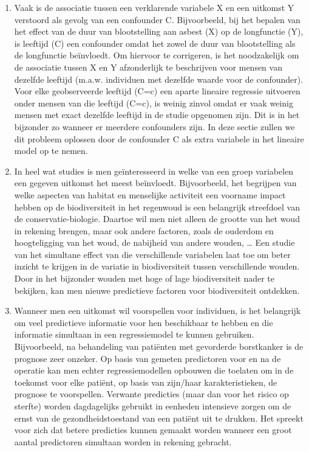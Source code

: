 \documentclass[
  dutch,
  letterpaper,
  12pt]{book}
\theoremstyle{definition}
\theoremstyle{definition}
\theoremstyle{definition}
\theoremstyle{remark}
\begin{document}
\begin{enumerate}
\def\labelenumi{\arabic{enumi}.}
\item
  Vaak is de associatie tussen een verklarende variabele X en een
  uitkomst Y verstoord als gevolg van een confounder C. Bijvoorbeeld,
  bij het bepalen van het effect van de duur van blootstelling aan
  asbest (X) op de longfunctie (Y), is leeftijd (C) een confounder omdat
  het zowel de duur van blootstelling als de longfunctie beïnvloedt. Om
  hiervoor te corrigeren, is het noodzakelijk om de associatie tussen X
  en Y afzonderlijk te beschrijven voor mensen van dezelfde leeftijd
  (m.a.w. individuen met dezelfde waarde voor de confounder). Voor elke
  geobserveerde leeftijd (C=c) een aparte lineaire regressie uitvoeren
  onder mensen van die leeftijd (C=c), is weinig zinvol omdat er vaak
  weinig mensen met exact dezelfde leeftijd in de studie opgenomen zijn.
  Dit is in het bijzonder zo wanneer er meerdere confounders zijn. In
  deze sectie zullen we dit probleem oplossen door de confounder C als
  extra variabele in het lineaire model op te nemen.
\item
  In heel wat studies is men geïnteresseerd in welke van een groep
  variabelen een gegeven uitkomst het meest beïnvloedt. Bijvoorbeeld,
  het begrijpen van welke aspecten van habitat en menselijke activiteit
  een voorname impact hebben op de biodiversiteit in het regenwoud is
  een belangrijk streefdoel van de conservatie-biologie. Daartoe wil men
  niet alleen de grootte van het woud in rekening brengen, maar ook
  andere factoren, zoals de ouderdom en hoogteligging van het woud, de
  nabijheid van andere wouden, \ldots{} Een studie van het simultane
  effect van die verschillende variabelen laat toe om beter inzicht te
  krijgen in de variatie in biodiversiteit tussen verschillende wouden.
  Door in het bijzonder wouden met hoge of lage biodiversiteit nader te
  bekijken, kan men nieuwe predictieve factoren voor biodiversiteit
  ontdekken.
\item
  Wanneer men een uitkomst wil voorspellen voor individuen, is het
  belangrijk om veel predictieve informatie voor hen beschikbaar te
  hebben en die informatie simultaan in een regressiemodel te kunnen
  gebruiken. Bijvoorbeeld, na behandeling van patiënten met gevorderde
  borstkanker is de prognose zeer onzeker. Op basis van gemeten
  predictoren voor en na de operatie kan men echter regressiemodellen
  opbouwen die toelaten om in de toekomst voor elke patiënt, op basis
  van zijn/haar karakteristieken, de prognose te voorspellen. Verwante
  predicties (maar dan voor het risico op sterfte) worden dagdagelijks
  gebruikt in eenheden intensieve zorgen om de ernst van de
  gezondheidstoestand van een patiënt uit te drukken. Het spreekt voor
  zich dat betere predicties kunnen gemaakt worden wanneer een groot
  aantal predictoren simultaan worden in rekening gebracht.
\end{enumerate}
\end{document}
